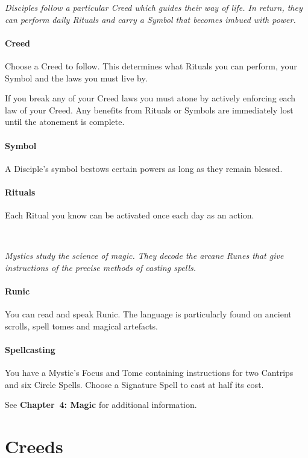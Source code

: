 \documentclass[itdr]{subfiles}
\begin{document}
{\em Disciples follow a particular Creed which guides their way of life. In return, they can perform daily Rituals and carry a Symbol that becomes imbued with power.}

\paragraph{Creed}
Choose a Creed to follow. This determines what Rituals you can perform, your Symbol and the laws you must live by.

If you break any of your Creed laws you must atone by actively enforcing each law of your Creed. Any benefits from Rituals or Symbols are immediately lost until the atonement is complete.

\paragraph{Symbol}
A Disciple's symbol bestows certain powers as long as they remain blessed.

\paragraph{Rituals}
Each Ritual you know can be activated once each day as an action.

~

{\em Mystics study the science of magic. They decode the arcane Runes that give instructions of the precise methods of casting spells.}

\paragraph{Runic}
You can read and speak Runic. The language is particularly found on ancient scrolls, spell tomes and magical artefacts.

\paragraph{Spellcasting}
You have a Mystic's Focus and Tome containing instructions for two Cantrips and six  Circle Spells. Choose a Signature Spell to cast at half its cost.

See \textbf{Chapter~4: Magic} for additional information.

\vfill
\break

\section{Creeds}
\end{document}
